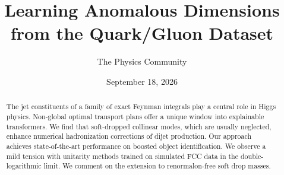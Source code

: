 \documentclass[11pt]{article}
\title{Learning Anomalous Dimensions from the Quark/Gluon Dataset}
\author{The Physics Community}
\date{September 18, 2026}
\numberwithin{equation}{section}
\theoremstyle{definition}
\theoremstyle{remark}
\begin{document}
\maketitle
\begin{abstract}
The jet constituents of a family of exact Feynman integrals play a
central role in Higgs physics. Non-global optimal transport plans offer
a unique window into explainable transformers. We find that soft-dropped
collinear modes, which are usually neglected, enhance numerical
hadronization corrections of dijet production. Our approach achieves
state-of-the-art performance on boosted object identification. We
observe a mild tension with unitarity methods trained on simulated FCC
data in the double-logarithmic limit. We comment on the extension to
renormalon-free soft drop masses.
\end{abstract}
\tableofcontents





\nocite{*}


\end{document}
